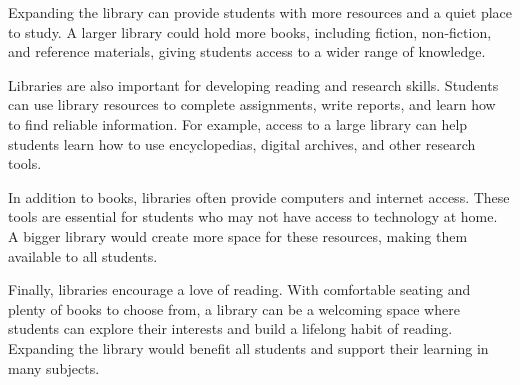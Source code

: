 \documentclass[12pt]{article}
\begin{document}
\vspace{1em}

\begin{tcolorbox}[colframe=black!60, colback=white, 
coltitle=black, colbacktitle=black!15, fonttitle=\bfseries\Large, 
title=Source 2: Expanding the Library, halign title=center, left=10pt, right=10pt, top=10pt, bottom=15pt]
Expanding the library can provide students with more resources and a quiet place to study. A larger library could hold more books, including fiction, non-fiction, and reference materials, giving students access to a wider range of knowledge.

Libraries are also important for developing reading and research skills. Students can use library resources to complete assignments, write reports, and learn how to find reliable information. For example, access to a large library can help students learn how to use encyclopedias, digital archives, and other research tools.

In addition to books, libraries often provide computers and internet access. These tools are essential for students who may not have access to technology at home. A bigger library would create more space for these resources, making them available to all students.

Finally, libraries encourage a love of reading. With comfortable seating and plenty of books to choose from, a library can be a welcoming space where students can explore their interests and build a lifelong habit of reading. Expanding the library would benefit all students and support their learning in many subjects.
\end{tcolorbox}

\vspace{1em}
\end{document}

